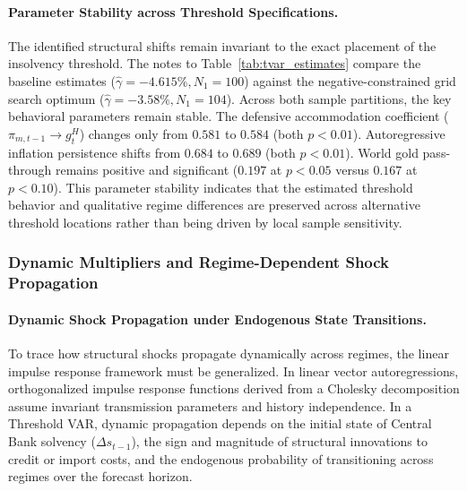 \paragraph{Parameter Stability across Threshold Specifications.}
The identified structural shifts remain invariant to the exact placement of the insolvency threshold. The notes to Table~\ref{tab:tvar_estimates} compare the baseline estimates ($\hat{\gamma} = -4.615\%, N_1 = 100$) against the negative-constrained grid search optimum ($\hat{\gamma} = -3.58\%, N_1 = 104$). Across both sample partitions, the key behavioral parameters remain stable. The defensive accommodation coefficient ($\pi_{m,t-1} \to g^H_t$) changes only from $0.581$ to $0.584$ (both $p < 0.01$). Autoregressive inflation persistence shifts from $0.684$ to $0.689$ (both $p < 0.01$). World gold pass-through remains positive and significant ($0.197$ at $p < 0.05$ versus $0.167$ at $p < 0.10$). This parameter stability indicates that the estimated threshold behavior and qualitative regime differences are preserved across alternative threshold locations rather than being driven by local sample sensitivity.



\subsubsection{Dynamic Multipliers and Regime-Dependent Shock Propagation}
\label{sec:tvar_girf_multipliers}

\paragraph{Dynamic Shock Propagation under Endogenous State Transitions.}
To trace how structural shocks propagate dynamically across regimes, the linear impulse response framework must be generalized. In linear vector autoregressions, orthogonalized impulse response functions derived from a Cholesky decomposition assume invariant transmission parameters and history independence. In a Threshold VAR, dynamic propagation depends on the initial state of Central Bank solvency ($\Delta s_{t-1}$), the sign and magnitude of structural innovations to credit or import costs, and the endogenous probability of transitioning across regimes over the forecast horizon.

